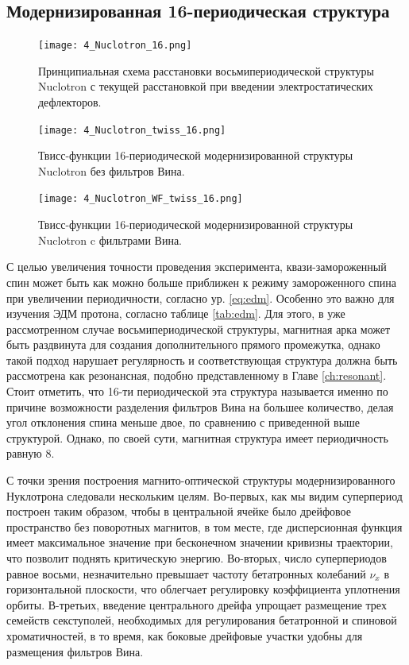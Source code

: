 \newpage
	\subsection{Модернизированная 16-периодическая структура}\label{sec:EDM/optics/16period}

\begin{figure}[!h]
  \centering
   \texttt{[image: 4\_Nuclotron\_16.png]}
   \caption{Принципиальная схема расстановки восьмипериодической структуры Nuclotron с текущей расстановкой при введении электростатических дефлекторов.}
   \label{fig:4_Nuclotron_16}
\end{figure}

\begin{figure}[!h]
  \centering
   \texttt{[image: 4\_Nuclotron\_twiss\_16.png]}
   \caption{Твисс-функции 16-периодической модернизированной структуры Nuclotron без фильтров Вина.}
   \label{fig:4_Nuclotron_twiss_16}
\end{figure}

\begin{figure}[!h]
  \centering
   \texttt{[image: 4\_Nuclotron\_WF\_twiss\_16.png]}
   \caption{Твисс-функции 16-периодической модернизированной структуры Nuclotron c фильтрами Вина.}
   \label{fig:4_Nuclotron_twiss_16}
\end{figure}

\par С целью увеличения точности проведения эксперимента, квази-замороженный спин может быть как можно больше приближен к режиму замороженного спина при увеличении периодичности, согласно ур. \ref{eq:edm}. Особенно это важно для изучения ЭДМ протона, согласно таблице \ref{tab:edm}. Для этого, в уже рассмотренном случае восьмипериодической структуры, магнитная арка может быть раздвинута для создания дополнительного прямого промежутка, однако такой подход нарушает регулярность и соответствующая структура должна быть рассмотрена как резонансная, подобно представленному в Главе \ref{ch:resonant}. Стоит отметить, что 16-ти периодической эта структура называется именно по причине возможности разделения фильтров Вина на большее количество, делая угол отклонения спина меньше двое, по сравнению с приведенной выше структурой. Однако, по своей сути, магнитная структура имеет периодичность равную 8.

\par С точки зрения построения магнито-оптической структуры модернизированного Нуклотрона следовали нескольким целям. Во-первых, как мы видим суперпериод построен таким образом, чтобы в центральной ячейке было дрейфовое пространство без поворотных магнитов, в том месте, где дисперсионная функция имеет максимальное значение при бесконечном значении кривизны траектории, что позволит поднять критическую энергию. Во-вторых, число суперпериодов равное восьми, незначительно превышает частоту бетатронных колебаний ${\nu}_x$ в горизонтальной плоскости, что облегчает регулировку коэффициента уплотнения орбиты. В-третьих, введение центрального дрейфа упрощает размещение трех семейств секступолей, необходимых для регулирования бетатронной и спиновой хроматичностей, в то время, как боковые дрейфовые участки удобны для размещения фильтров Вина.

